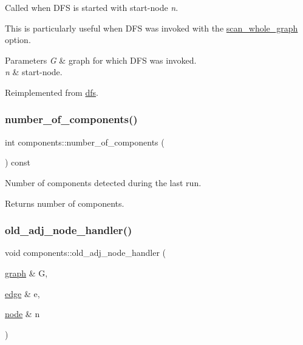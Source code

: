 Called when D\+FS is started with start-\/node {\itshape n}. 

This is particularly useful when D\+FS was invoked with the \mbox{\hyperlink{classdfs_aa7c864a6f3a120720138b187b3ed95b5}{scan\+\_\+whole\+\_\+graph}} option.


\begin{DoxyParams}{Parameters}
{\em G} & graph for which D\+FS was invoked. \\
\hline
{\em n} & start-\/node. \\
\hline
\end{DoxyParams}


Reimplemented from \mbox{\hyperlink{classdfs_a3b5fbea7a7baed9946cfb4444a7f20ea}{dfs}}.

\mbox{\label{classcomponents_ad3206d2d050ed7719f7140ea3bee81f8}} 
\subsubsection{\texorpdfstring{number\+\_\+of\+\_\+components()}{number\_of\_components()}}
{\footnotesize\ttfamily int components\+::number\+\_\+of\+\_\+components (\begin{DoxyParamCaption}{ }\end{DoxyParamCaption}) const\hspace{0.3cm}{\ttfamily [inline]}}



Number of components detected during the last run. 

\begin{DoxyReturn}{Returns}
number of components. 
\end{DoxyReturn}
\mbox{\label{classcomponents_afcf7a0bee5104bba7986039a9d6bd1ee}} 
\subsubsection{\texorpdfstring{old\+\_\+adj\+\_\+node\+\_\+handler()}{old\_adj\_node\_handler()}}
{\footnotesize\ttfamily void components\+::old\+\_\+adj\+\_\+node\+\_\+handler (\begin{DoxyParamCaption}\item[{\mbox{\hyperlink{classgraph}{graph}} \&}]{G,  }\item[{\mbox{\hyperlink{classedge}{edge}} \&}]{e,  }\item[{\mbox{\hyperlink{classnode}{node}} \&}]{n }\end{DoxyParamCaption})\hspace{0.3cm}{\ttfamily [virtual]}}



